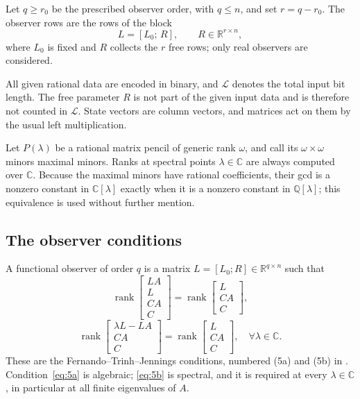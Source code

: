 Let $q\ge r_0$ be the prescribed observer order, with $q\le n$, and set $r=q-r_0$. The
observer rows are the rows of the block
\begin{equation*}
L=[L_0;\,R],\qquad R\in\mathbb R^{r\times n},
\end{equation*}
where $L_0$ is fixed and $R$ collects the $r$ free rows; only real observers are
considered.

All given rational data are encoded in binary, and $\mathcal L$ denotes the total input
bit length. The free parameter $R$ is not part of the given input data and is therefore
not counted in $\mathcal L$. State vectors are column vectors, and matrices act on them by
the usual left multiplication.

Let $P(\lambda)$ be a rational matrix pencil of generic rank $\omega$, and call its
$\omega\times\omega$ minors maximal minors. Ranks at spectral points $\lambda\in\mathbb C$
are always computed over $\mathbb C$. Because the maximal minors have rational
coefficients, their gcd is a nonzero constant in $\mathbb C[\lambda]$ exactly when it is a
nonzero constant in $\mathbb Q[\lambda]$; this equivalence is used without further
mention.

\subsection{The observer conditions}\label{sec:conditions}

A functional observer of order $q$ is a matrix $L=[L_0;R]\in\mathbb R^{q\times n}$ such
that
\begin{equation}\label{eq:5a}
\operatorname{rank}\begin{bmatrix}LA\\ L\\ CA\\ C\end{bmatrix}
=\operatorname{rank}\begin{bmatrix}L\\ CA\\ C\end{bmatrix},
\end{equation}
\begin{equation}\label{eq:5b}
\operatorname{rank}\begin{bmatrix}\lambda L-LA\\ CA\\ C\end{bmatrix}
=\operatorname{rank}\begin{bmatrix}L\\ CA\\ C\end{bmatrix},
\quad \forall\lambda\in\mathbb C.
\end{equation}
These are the Fernando--Trinh--Jennings conditions, numbered (5a) and (5b) in
\cite{fer10}. Condition~\eqref{eq:5a} is algebraic; \eqref{eq:5b} is spectral, and it is
required at every $\lambda\in\mathbb C$, in particular at all finite eigenvalues of $A$.

